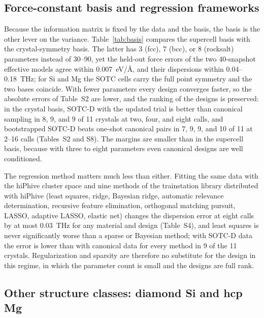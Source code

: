 \documentclass[aip,jap,reprint,amsmath,amssymb,floatfix]{revtex4-2}
\begin{document}
\subsection{Force-constant basis and regression frameworks}\label{sec:design}

Because the information matrix is fixed by the data and the basis, the
basis is the other lever on the variance. Table~\ref{tab:basis} compares the
supercell basis with the crystal-symmetry basis. The latter has 3 (fcc), 7
(bcc), or 8 (rocksalt) parameters instead of 30--90, yet the held-out force
errors of the two 40-snapshot effective models agree within 0.007~eV/\AA,
and their dispersions within 0.04--0.18~THz; for Si and Mg the SOTC cells
carry the full point symmetry and the two bases coincide. With fewer
parameters every design converges faster, so the absolute errors of
Table~S2 are lower, and the ranking of the designs is preserved: in the
crystal basis, SOTC-D with the updated trial is better than canonical
sampling in 8, 9, and 9 of 11 crystals at two, four, and eight calls, and
bootstrapped SOTC-D beats one-shot canonical pairs in 7, 9, 9, and 10 of 11
at 2--16 calls (Tables~S2 and S8). The margins are smaller than in the supercell
basis, because with three to eight parameters even canonical designs are well
conditioned.

The regression method matters much less than either. Fitting the same data
with the hiPhive cluster space \cite{ref59} and nine methods of the trainstation
library distributed with hiPhive
(least squares, ridge, Bayesian ridge, automatic relevance determination,
recursive feature elimination, orthogonal matching pursuit, LASSO, adaptive
LASSO, elastic net) changes the dispersion error at eight calls by at most
0.03~THz for any material and design (Table~S4), and least squares is never
significantly worse than a sparse or Bayesian method; with SOTC-D data the
error is lower than with canonical data for every method in 9 of the 11
crystals. Regularization and sparsity are therefore no substitute for the
design in this regime, in which the parameter count is small and the
designs are full rank.



\subsection{Other structure classes: diamond Si and hcp Mg}
\end{document}

